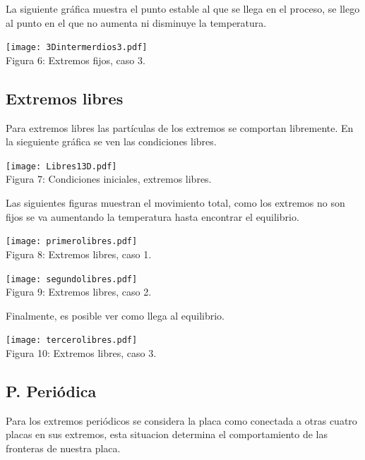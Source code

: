 \documentclass{article}
\begin{document}
La siguiente gráfica muestra el punto estable al que se llega en el proceso, se llego al punto en el que no aumenta ni disminuye la temperatura.


\begin{center}
\texttt{[image: 3Dintermerdios3.pdf]}\\
\small{Figura 6: Extremos fijos, caso 3.}
\end{center}

\subsection{Extremos libres}

Para extremos libres las partículas de los extremos se comportan libremente. En la sieguiente gráfica se ven las condiciones libres.

\begin{center}
\texttt{[image: Libres13D.pdf]}\\
\small{Figura 7: Condiciones iniciales, extremos libres.}
\end{center}

Las siguientes figuras muestran el movimiento total, como los extremos no son fijos se va aumentando la temperatura hasta encontrar el equilibrio.
\begin{center}
\texttt{[image: primerolibres.pdf]}\\
\small{Figura 8: Extremos libres, caso 1.}
\end{center}

\begin{center}
\texttt{[image: segundolibres.pdf]}\\
\small{Figura 9: Extremos libres, caso 2.}
\end{center}

Finalmente, es posible ver como llega al equilibrio.
\begin{center}
\texttt{[image: tercerolibres.pdf]}\\
\small{Figura 10: Extremos libres, caso 3.}
\end{center}

\subsection{P. Periódica}

Para los extremos periódicos se considera la placa como conectada a otras cuatro placas en sus extremos, esta situacion determina el comportamiento de las fronteras de nuestra placa.
\end{document}
